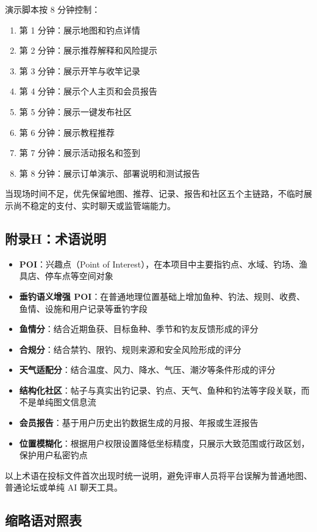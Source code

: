 演示脚本按 8 分钟控制：
\begin{enumerate}
  \item 第 1 分钟：展示地图和钓点详情
  \item 第 2 分钟：展示推荐解释和风险提示
  \item 第 3 分钟：展示开竿与收竿记录
  \item 第 4 分钟：展示个人主页和会员报告
  \item 第 5 分钟：展示一键发布社区
  \item 第 6 分钟：展示教程推荐
  \item 第 7 分钟：展示活动报名和签到
  \item 第 8 分钟：展示订单演示、部署说明和测试报告
\end{enumerate}

当现场时间不足，优先保留地图、推荐、记录、报告和社区五个主链路，不临时展示尚不稳定的支付、实时聊天或监管端能力。

\subsection{附录H：术语说明}

\begin{itemize}
  \item \textbf{POI}：兴趣点（Point of Interest），在本项目中主要指钓点、水域、钓场、渔具店、停车点等空间对象
  \item \textbf{垂钓语义增强 POI}：在普通地理位置基础上增加鱼种、钓法、规则、收费、鱼情、设施和用户记录等垂钓字段
  \item \textbf{鱼情分}：结合近期鱼获、目标鱼种、季节和钓友反馈形成的评分
  \item \textbf{合规分}：结合禁钓、限钓、规则来源和安全风险形成的评分
  \item \textbf{天气适配分}：结合温度、风力、降水、气压、潮汐等条件形成的评分
  \item \textbf{结构化社区}：帖子与真实出钓记录、钓点、天气、鱼种和钓法等字段关联，而不是单纯图文信息流
  \item \textbf{会员报告}：基于用户历史出钓数据生成的月报、年报或生涯报告
  \item \textbf{位置模糊化}：根据用户权限设置降低坐标精度，只展示大致范围或行政区划，保护用户私密钓点
\end{itemize}

以上术语在投标文件首次出现时统一说明，避免评审人员将平台误解为普通地图、普通论坛或单纯 AI 聊天工具。

\subsection{缩略语对照表}

